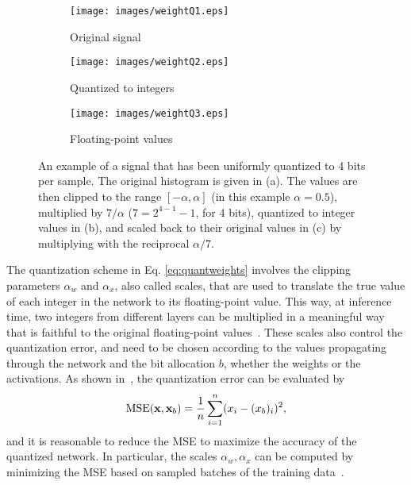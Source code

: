 \documentclass[reqno]{amsart}
\newcommand{\bfx}{ {\bf x}}
\begin{document}
\begin{figure}
\begin{center}
\begin{subfigure}[b]{0.32\textwidth}
         \centering
         \texttt{[image: images/weightQ1.eps]}
         \caption{Original signal}
     \end{subfigure}
     \hfill
     \begin{subfigure}[b]{0.32\textwidth}
         \centering
         \texttt{[image: images/weightQ2.eps]}
         \caption{Quantized to integers}
     \end{subfigure}
     \hfill
     \begin{subfigure}[b]{0.32\textwidth}
         \centering
         \texttt{[image: images/weightQ3.eps]}
         \caption{Floating-point values}
     \end{subfigure}
\caption{An example of a signal that has been uniformly quantized to 4 bits per sample. The original histogram is given in (a). The values are then clipped to the range $[-\alpha,\alpha]$ (in this example $\alpha=0.5$), multiplied by $7/\alpha$ ($7=2^{4-1}-1$, for 4 bits), quantized to integer values in (b), and scaled back to their original values in (c) by multiplying with the reciprocal $\alpha/7$.}
\label{fig:quantized_weights_example}
\end{center}
\end{figure}

The quantization scheme in Eq. \eqref{eq:quantweights} involves the clipping parameters $\alpha_w$ and $\alpha_x$, also called scales, that are used to translate the true value of each integer in the network to its floating-point value. This way, at inference time, two integers from different layers can be multiplied in a meaningful way that is faithful to the original floating-point values~\cite{gemmlowp,hubara2017quantized}. These scales also control the quantization error, and need to be chosen according to the values propagating through the network and the bit allocation $b$, whether the weights or the activations. As shown in~\cite{soudry1}, the quantization error can be evaluated by
\begin{equation}\label{eq:MSE}
\mbox{MSE}(\bfx,\bfx_b) = \frac{1}{n}\sum_{i=1}^{n} (x_{i}-(x_b)_{i})^2,
\end{equation}
and it is reasonable to reduce the MSE to maximize the accuracy of the quantized network. In particular, the scales $\alpha_w,\alpha_x$ can be computed by minimizing the MSE based on sampled batches of the training data~\cite{soudry1}.
\end{document}
